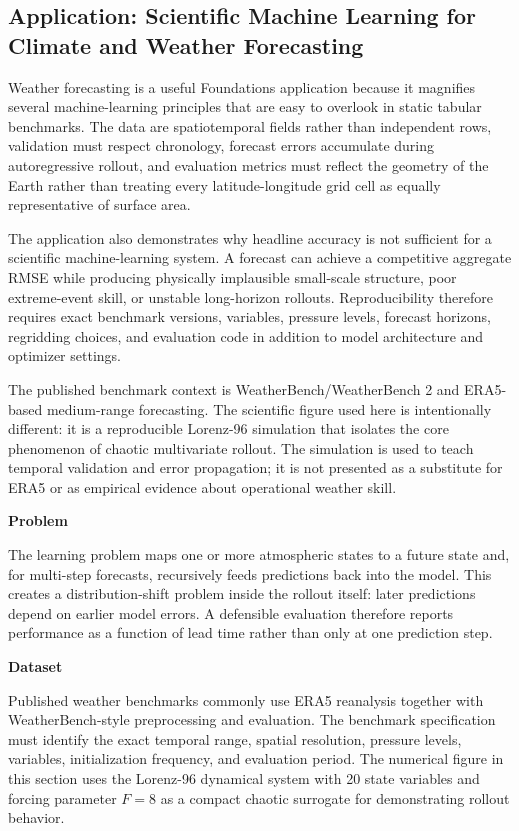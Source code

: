 \subsection{Application: Scientific Machine Learning for Climate and Weather Forecasting}

Weather forecasting is a useful Foundations application because it magnifies several machine-learning principles that are easy to overlook in static tabular benchmarks. The data are spatiotemporal fields rather than independent rows, validation must respect chronology, forecast errors accumulate during autoregressive rollout, and evaluation metrics must reflect the geometry of the Earth rather than treating every latitude-longitude grid cell as equally representative of surface area.

The application also demonstrates why headline accuracy is not sufficient for a scientific machine-learning system. A forecast can achieve a competitive aggregate RMSE while producing physically implausible small-scale structure, poor extreme-event skill, or unstable long-horizon rollouts. Reproducibility therefore requires exact benchmark versions, variables, pressure levels, forecast horizons, regridding choices, and evaluation code in addition to model architecture and optimizer settings.

The published benchmark context is WeatherBench/WeatherBench 2 and ERA5-based medium-range forecasting. The scientific figure used here is intentionally different: it is a reproducible Lorenz-96 simulation that isolates the core phenomenon of chaotic multivariate rollout. The simulation is used to teach temporal validation and error propagation; it is not presented as a substitute for ERA5 or as empirical evidence about operational weather skill.

\textbf{Problem}

The learning problem maps one or more atmospheric states to a future state and, for multi-step forecasts, recursively feeds predictions back into the model. This creates a distribution-shift problem inside the rollout itself: later predictions depend on earlier model errors. A defensible evaluation therefore reports performance as a function of lead time rather than only at one prediction step.

\textbf{Dataset}

Published weather benchmarks commonly use ERA5 reanalysis together with WeatherBench-style preprocessing and evaluation. The benchmark specification must identify the exact temporal range, spatial resolution, pressure levels, variables, initialization frequency, and evaluation period. The numerical figure in this section uses the Lorenz-96 dynamical system with 20 state variables and forcing parameter \(F=8\) as a compact chaotic surrogate for demonstrating rollout behavior.

